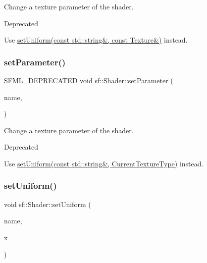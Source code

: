 Change a texture parameter of the shader. 

\begin{DoxyRefDesc}{Deprecated}
\item[\hyperlink{deprecated__deprecated000013}{Deprecated}]Use \hyperlink{classsf_1_1_shader_a7806a29ffbd0ee9251256a9e7265d479}{set\+Uniform(const std\+::string\&, const Texture\&)} instead.\end{DoxyRefDesc}
\mbox{\label{classsf_1_1_shader_a0fa7ecad14206e4d5edae1d6aa87f553}} 
\subsubsection{\texorpdfstring{set\+Parameter()}{setParameter()}\hspace{0.1cm}{\footnotesize\ttfamily [10/10]}}
{\footnotesize\ttfamily S\+F\+M\+L\+\_\+\+D\+E\+P\+R\+E\+C\+A\+T\+ED void sf\+::\+Shader\+::set\+Parameter (\begin{DoxyParamCaption}\item[{const std\+::string \&}]{name,  }\item[{\hyperlink{structsf_1_1_shader_1_1_current_texture_type}{Current\+Texture\+Type}}]{ }\end{DoxyParamCaption})}



Change a texture parameter of the shader. 

\begin{DoxyRefDesc}{Deprecated}
\item[\hyperlink{deprecated__deprecated000014}{Deprecated}]Use \hyperlink{classsf_1_1_shader_ab18f531e1f726b88fec1cf5a1e6af26d}{set\+Uniform(const std\+::string\&, Current\+Texture\+Type)} instead.\end{DoxyRefDesc}
\mbox{\label{classsf_1_1_shader_abf78e3bea1e9b0bab850b6b0a0de29c7}} 
\subsubsection{\texorpdfstring{set\+Uniform()}{setUniform()}\hspace{0.1cm}{\footnotesize\ttfamily [1/16]}}
{\footnotesize\ttfamily void sf\+::\+Shader\+::set\+Uniform (\begin{DoxyParamCaption}\item[{const std\+::string \&}]{name,  }\item[{float}]{x }\end{DoxyParamCaption})}



